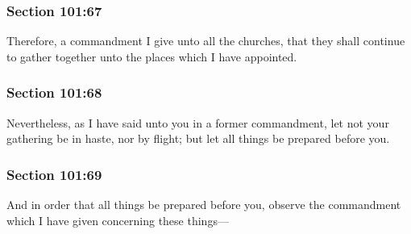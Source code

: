 	\subsubsection{Section 101:67} %
		\label{DC101-67}

		Therefore, a commandment I give unto all the churches, that they shall continue to gather together unto the places which I have appointed.


	\subsubsection{Section 101:68} %
		\label{DC101-68}

		Nevertheless, as I have said unto you in a former commandment, let not your gathering be in haste, nor by flight; but let all things be prepared before you.


	\subsubsection{Section 101:69} %
		\label{DC101-69}

		And in order that all things be prepared before you, observe the commandment which I have given concerning these things---



